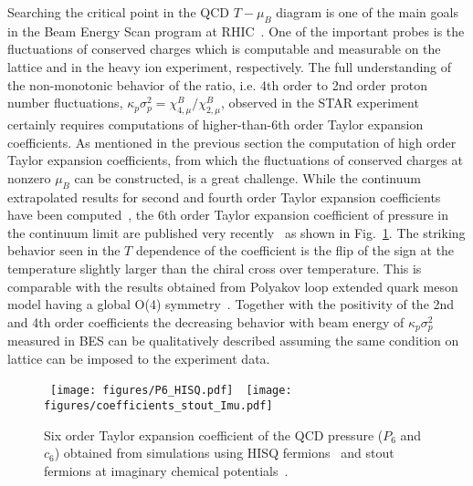 \documentclass{PoS}
\begin{document}
Searching the critical point in the QCD $T-\mu_B$ diagram is one of the main goals in the Beam Energy Scan program at RHIC~\cite{Luo:2017faz}.
One of the important probes is the fluctuations of conserved charges which is computable and measurable on the lattice and in the heavy ion experiment, respectively.
The full understanding of the non-monotonic behavior of the ratio, i.e.  4th order to 2nd order proton number fluctuations, $\kappa_p\sigma^2_p=\chi_{4,\mu}^B/\chi_{2,\mu}^B$, observed in the STAR experiment certainly requires computations of higher-than-6th order Taylor expansion coefficients.
As mentioned in the previous section the computation of high order Taylor expansion coefficients, from which the fluctuations of conserved charges at nonzero $\mu_B$ can 
be constructed, is a great challenge. While the continuum extrapolated results for second and fourth order Taylor expansion coefficients have been computed~\cite{Borsanyi:2011sw,Bazavov:2012jq,Bazavov:2013uja,Ding:2015fca,Bellwied:2015lba}, the 6th order Taylor expansion coefficient of pressure in the continuum limit
are published very recently~\cite{Bazavov:2017dus,Gunther:2016vcp} as shown in Fig.~\ref{fig:6thExpCoeff}. The striking behavior seen in the $T$ dependence of the coefficient is the 
flip of the sign at the temperature slightly larger than the chiral cross over temperature. This is comparable with the results obtained from 
Polyakov loop extended quark meson model having a global O(4) symmetry~\cite{Friman:2011pf}.
Together with the positivity of the 2nd and 4th order coefficients the decreasing behavior with beam energy of $\kappa_p\sigma^2_p$ measured in BES can be qualitatively described assuming the same condition on lattice can be imposed 
to the experiment data.
\begin{figure}
\begin{center}
~\texttt{[image: figures/P6\_HISQ.pdf]}~~\texttt{[image: figures/coefficients\_stout\_Imu.pdf]}
\end{center}
\caption{Six order Taylor expansion coefficient of the QCD pressure ($P_6$ and $c_6$) obtained from simulations using HISQ fermions~\cite{Bazavov:2017dus} and stout fermions at imaginary chemical potentials~\cite{Gunther:2016vcp}.}
\label{fig:6thExpCoeff}
\end{figure}
\end{document}
